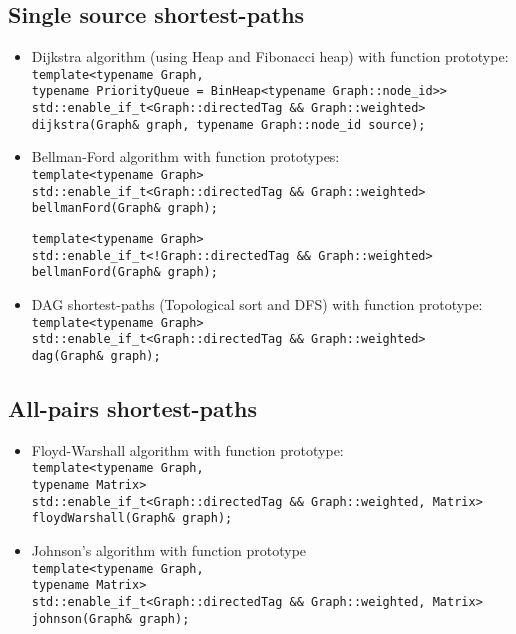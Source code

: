\documentclass{article}
\begin{document}
\subsection*{Single source shortest-paths}
\begin{itemize}
\item Dijkstra algorithm (using Heap and Fibonacci heap) with function prototype:\\
\texttt{template<typename Graph,\\\hspace*{4.75em}typename PriorityQueue = BinHeap<typename Graph::node\_id>>\\
std::enable\_if\_t<Graph::directedTag \&\& Graph::weighted>\\
dijkstra(Graph\& graph, typename Graph::node\_id source);}
\item Bellman-Ford algorithm with function prototypes:\\
\texttt{template<typename Graph>\\
std::enable\_if\_t<Graph::directedTag \&\& Graph::weighted>\\
bellmanFord(Graph\& graph);}

\texttt{template<typename Graph>\\
std::enable\_if\_t<!Graph::directedTag \&\& Graph::weighted>\\
bellmanFord(Graph\& graph);}
\item DAG shortest-paths (Topological sort and DFS) with function prototype:\\
\texttt{template<typename Graph>\\
std::enable\_if\_t<Graph::directedTag \&\& Graph::weighted>\\
dag(Graph\& graph);}
\end{itemize}
\subsection*{All-pairs shortest-paths}
\begin{itemize}
\item Floyd-Warshall algorithm with function prototype:\\
\texttt{template<typename Graph,\\\hspace*{4.75em}typename Matrix>\\
std::enable\_if\_t<Graph::directedTag \&\& Graph::weighted, Matrix>\\
floydWarshall(Graph\& graph);}
\item Johnson's algorithm with function prototype\\
\texttt{template<typename Graph,\\\hspace*{4.75em}typename Matrix>\\
std::enable\_if\_t<Graph::directedTag \&\& Graph::weighted, Matrix>\\
johnson(Graph\& graph);}
\end{itemize}
\end{document}
